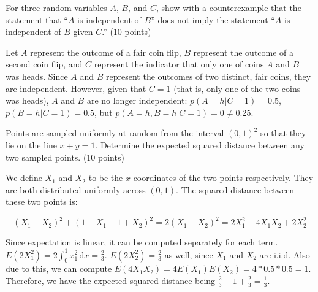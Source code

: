\documentclass[fleqn]{homework}
\begin{document}
  \maketitle

  \begin{problem}{1}
    \begin{question}
      For three random variables $A$, $B$, and $C$, show with a counterexample
      that the statement that ``$A$ is independent of $B$'' does not imply the
      statement ``$A$ is independent of $B$ given $C$.'' (10 points)
    \end{question}

    Let $A$ represent the outcome of a fair coin flip, $B$ represent the outcome
    of a second coin flip, and $C$ represent the indicator that only one of
    coins $A$ and $B$ was heads.  Since $A$ and $B$ represent the outcomes of
    two distinct, fair coins, they are independent.  However, given that $C=1$
    (that is, only one of the two coins was heads), $A$ and $B$ are no longer
    independent: $p(A=h|C=1) = 0.5$, $p(B=h|C=1) = 0.5$, but
    $p(A=h, B=h | C=1) = 0 \neq 0.25$.
  \end{problem}

  \begin{problem}{2}
    \begin{question}
      Points are sampled uniformly at random from the interval $(0,1)^2$ so that
      they lie on the line $x+y=1$.  Determine the expected squared distance
      between any two sampled points. (10 points)
    \end{question}

    We define $X_1$ and $X_2$ to be the $x$-coordinates of the two points
    respectively.  They are both distributed uniformly across $(0, 1)$.  The
    squared distance between these two points is:

    \begin{equation}
      (X_1 - X_2)^2 + (1 - X_1 - 1 + X_2)^2 = 2(X_1 - X_2)^2 = 2X_1^2 - 4X_1X_2 + 2X_2^2
    \end{equation}

    Since expectation is linear, it can be computed separately for each term.
    $E(2X_1^2) = 2 \int_0^1 \! x_1^2 \,\mathrm{d} x = \frac{2}{3}$.
    $E(2X_2^2) = \frac{2}{3}$ as well, since $X_1$ and $X_2$ are i.i.d.  Also
    due to this, we can compute
    $E(4X_1X_2) = 4 E(X_1) E(X_2) = 4 * 0.5 * 0.5 = 1$.  Therefore, we have the
    expected squared distance being
    $\frac{2}{3} - 1 + \frac{2}{3} = \frac{1}{3}$.
  \end{problem}
\end{document}
